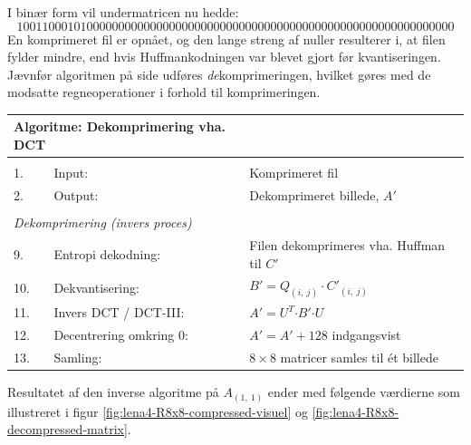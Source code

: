 I binær form vil undermatricen nu hedde: $$ 100110001010000000000000000000000000000000000000000000000000000000000 $$
En komprimeret fil er opnået, og den lange streng af nuller resulterer i, at filen fylder mindre, end hvis Huffmankodningen var blevet gjort før kvantiseringen. Jævnfør algoritmen på side \pageref{tb:Algoritme-Dekomprimering-DCT} udføres \textit{de}komprimeringen, hvilket gøres med de modsatte regneoperationer i forhold til komprimeringen.

\begin{table}[!h]
\centering
\begin{tabular}{lll}
\hline
\multicolumn{2}{l}{\textbf{Algoritme: Dekomprimering vha. DCT}}    &                                                                   \\ \hline
\\
\multicolumn{1}{|l}{1.}        & Input:                     & Komprimeret fil \\
\multicolumn{1}{|l}{2.}        & Output:                    & Dekomprimeret billede, $A'$                                           \\
                               &                            &                                                                   \\
\multicolumn{2}{|l}{\textit{Dekomprimering (invers proces)}} &                                                                   \\
\multicolumn{1}{|l}{9.}        & Entropi dekodning:         & Filen dekomprimeres vha. Huffman til $C'$             \\
\multicolumn{1}{|l}{10.}        & Dekvantisering:            & $B' = Q_{(i,\ j)} \cdot C'_{(i,\ j)}$                                                 \\
\multicolumn{1}{|l}{11.}       & Invers DCT / DCT-III:      & $A' = U^T \boldsymbol{\cdot} B' \boldsymbol{\cdot} U$\\
\multicolumn{1}{|l}{12.}       & Decentrering omkring 0:      & $A' = A' + 128$ indgangsvist\\
\multicolumn{1}{|l}{13.}       & Samling:                   & $8 \times 8$ matricer samles til ét billede
\\  
\end{tabular}
\label{tb:Algoritme-Dekomprimering-DCT}
\end{table}

Resultatet af den inverse algoritme på $A_{(1,\ 1)}$ ender med følgende værdierne som illustreret i figur \ref{fig:lena4-R8x8-compressed-visuel} og \ref{fig:lena4-R8x8-decompressed-matrix}.

